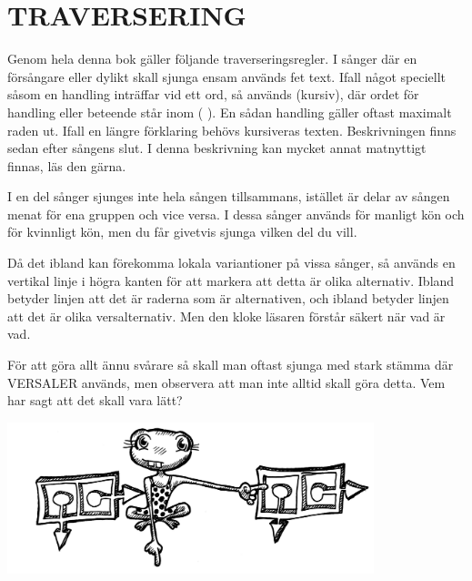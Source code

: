 \documentclass[a6paper,fontsize=10pt,twoside,open=right]{scrbook}
\makeatletter
\def\cleardoublepage{%
  \ifodd\c@page%
  \else%
    \ohead{}%
    \null%
    \newpage%
  \fi%
}%
\makeatother
\begin{document}
\section{TRAVERSERING}\vspace{10pt}
Genom hela denna bok gäller följande
traverseringsregler. I sånger där en försångare eller dylikt skall
sjunga ensam används fet text. Ifall något speciellt såsom en handling
inträffar vid ett ord, så används (kursiv), där ordet för handling
eller beteende står inom ( ). En sådan handling gäller oftast maximalt
raden ut. Ifall en längre förklaring behövs kursiveras
texten. Beskrivningen finns sedan efter sångens slut. I denna
beskrivning kan mycket annat matnyttigt finnas, läs den
gärna.

I en del sånger sjunges inte hela sången tillsammans,
istället är delar av sången menat för ena gruppen och vice versa. I
dessa sånger används {\Large\Male} för manligt kön och {\Large\Female}
för kvinnligt kön, men du får givetvis sjunga vilken del du vill.

\begin{leftborder}
  \hspace{15pt}Då det ibland kan förekomma lokala variantioner på vissa sånger, så
  används en  vertikal linje i högra kanten för att markera att detta
  är olika alternativ. Ibland betyder linjen att det är raderna som är
  alternativen, och ibland betyder linjen att det är olika
  versalternativ. Men den kloke läsaren förstår säkert när vad är vad.
\end{leftborder}

För att göra allt ännu svårare så skall man oftast sjunga med stark
stämma där VERSALER används, men observera att man inte alltid skall
göra detta. Vem har sagt att det skall vara lätt?
\newpage
\cleardoublepage
\renewcommand{\contentsname}{\vspace{-2.17cm}\rmfamily{\fontsize{13}{15}\textbf{INNEHÅLL}}\vspace{45pt}}
\tableofcontents\par
\begin{center}
  \vspace*{-300pt}
  \noindent\includegraphics[keepaspectratio,width=0.8\textwidth]{elements/groda.jpg}
\end{center}
\renewcommand{\leftmark}{}
\end{document}
